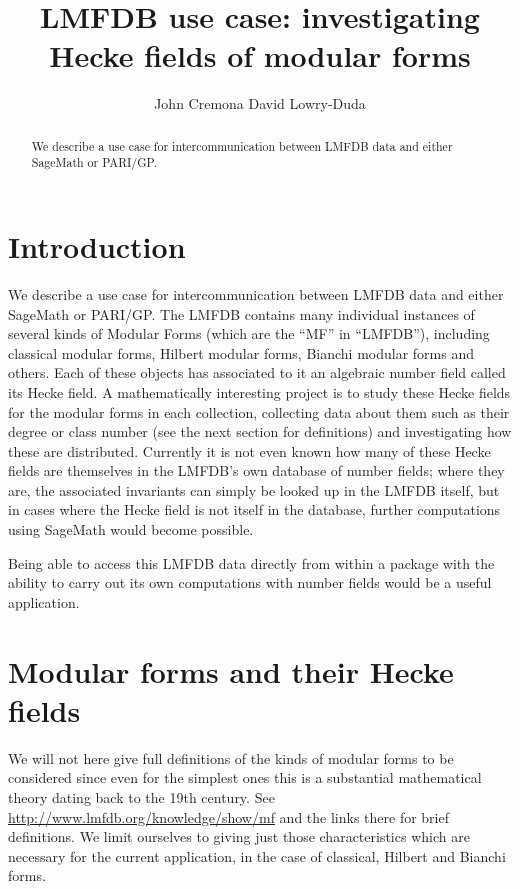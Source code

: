 \documentclass{llncs}
\title{LMFDB use case: investigating Hecke fields of modular forms}
\author{
John Cremona\inst{1}
David Lowry-Duda\inst{1}
}
\institute{
University of Warwick
}
\begin{document}
\maketitle
\begin{abstract}
  We describe a use case for intercommunication between LMFDB data and
  either SageMath or PARI/GP.
\end{abstract}

\section{Introduction}
We describe a use case for intercommunication between LMFDB data and
either SageMath or PARI/GP.  The LMFDB contains many individual
instances of several kinds of Modular Forms (which are the ``MF'' in
``LMFDB''), including classical modular forms, Hilbert modular forms,
Bianchi modular forms and others.  Each of these objects has
associated to it an algebraic number field called its Hecke field.  A
mathematically interesting project is to study these Hecke fields for
the modular forms in each collection, collecting data about them such
as their degree or class number (see the next section for definitions)
and investigating how these are distributed.  Currently it is not even
known how many of these Hecke fields are themselves in the LMFDB's own
database of number fields; where they are, the associated invariants
can simply be looked up in the LMFDB itself, but in cases where the
Hecke field is not itself in the database, further computations using
SageMath would become possible.

Being able to access this LMFDB data directly from within a package
with the ability to carry out its own computations with number fields
would be a useful application.

\section{Modular forms and their Hecke fields}
We will not here give full definitions of the kinds of modular forms
to be considered since even for the simplest ones this is a
substantial mathematical theory dating back to the 19th century.  See
\url{http://www.lmfdb.org/knowledge/show/mf} and the links there for
brief definitions.  We limit ourselves to giving just those
characteristics which are necessary for the current application, in
the case of classical, Hilbert and Bianchi forms.
\end{document}
